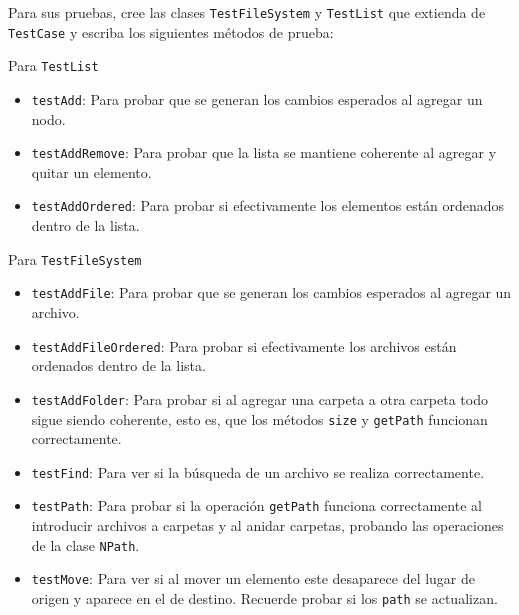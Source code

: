 \documentclass[11pt,spanish,letterpaper]{report}
\begin{document}
Para sus pruebas, cree las clases {\tt TestFileSystem} y {\tt TestList} que extienda de {\tt TestCase} y escriba los siguientes métodos de prueba:

Para {\tt TestList}
\begin{itemize}
	\item {\tt testAdd}: Para probar que se generan los cambios esperados al agregar un nodo.
	\item {\tt testAddRemove}: Para probar que la lista se mantiene coherente al agregar y quitar un elemento.
	\item {\tt testAddOrdered}: Para probar si efectivamente los elementos están ordenados dentro de la lista.
\end{itemize}

Para {\tt TestFileSystem}
\begin{itemize}
	\item {\tt testAddFile}: Para probar que se generan los cambios esperados al agregar un archivo.
	\item {\tt testAddFileOrdered}: Para probar si efectivamente los archivos están ordenados dentro de la lista.
	\item {\tt testAddFolder}: Para probar si al agregar una carpeta a otra carpeta todo sigue siendo coherente, esto es, que los métodos {\tt size} y {\tt getPath} funcionan correctamente.
	\item {\tt testFind}: Para ver si la búsqueda de un archivo se realiza correctamente.		
	\item {\tt testPath}: Para probar si la operación {\tt getPath} funciona correctamente al introducir archivos a carpetas y al anidar carpetas, probando las operaciones de la clase {\tt NPath}.
	\item {\tt testMove}: Para ver si al mover un elemento este desaparece del lugar de origen y aparece en el de destino. Recuerde probar si los {\tt path} se actualizan.
\end{itemize}
\end{document}

